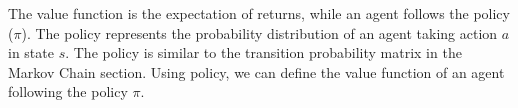 The value function is the expectation of returns, while an agent follows the policy (\(\pi\)). The policy represents the probability distribution of an agent taking action \(a\) in state \(s\). The policy is similar to the transition probability matrix in the Markov Chain section. Using policy, we can define the value function of an agent following the policy \(\pi\).